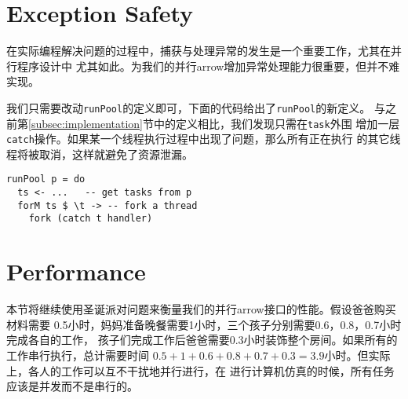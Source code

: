 \documentclass[conference]{IEEEtran}
\begin{document}
\section{Exception Safety}\label{sec:exception-safety}
在实际编程解决问题的过程中，捕获与处理异常的发生是一个重要工作，尤其在并行程序设计中
尤其如此。\cite{Marlow2001}为我们的并行arrow增加异常处理能力很重要，但并不难实现。

我们只需要改动\texttt{runPool}的定义即可，下面的代码给出了\texttt{runPool}的新定义。
与之前第\ref{subsec:implementation}节中的定义相比，我们发现只需在\texttt{task}外围
增加一层\texttt{catch}操作。如果某一个线程执行过程中出现了问题，那么所有正在执行
的其它线程将被取消，这样就避免了资源泄漏。

\begin{verbatim}
runPool p = do
  ts <- ...   -- get tasks from p
  forM ts $ \t -> -- fork a thread
    fork (catch t handler)
\end{verbatim}

\section{Performance}
本节将继续使用圣诞派对问题来衡量我们的并行arrow接口的性能。假设爸爸购买材料需要
0.5小时，妈妈准备晚餐需要1小时，三个孩子分别需要0.6，0.8，0.7小时完成各自的工作，
孩子们完成工作后爸爸需要0.3小时装饰整个房间。如果所有的工作串行执行，总计需要时间
$0.5+1+0.6+0.8+0.7+0.3=3.9$小时。但实际上，各人的工作可以互不干扰地并行进行，在
进行计算机仿真的时候，所有任务应该是并发而不是串行的。
\end{document}
